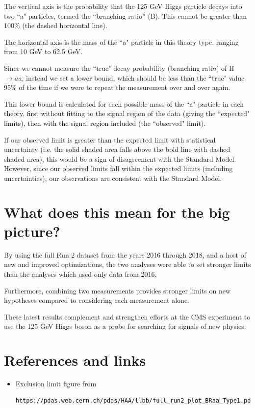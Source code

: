 \documentclass{article}
\begin{document}
The vertical axis is the probability that the 125 GeV Higgs particle decays into two ``a" particles, termed the ``branching ratio'' (B). This cannot be greater than 100\% (the dashed horizontal line). 

The horizontal axis is the mass of the ``a" particle in this theory type, ranging from 10 GeV to 62.5 GeV. 

Since we cannot measure the ``true" decay probability (branching ratio) of H $\rightarrow aa$, instead we set a lower bound, which should be less than the ``true" value 95\% of the time if we were to repeat the measurement over and over again.

This lower bound is calculated for each possible mass of the ``a" particle in each theory, first without fitting to the signal region of the data (giving the ``expected" limits), then with the signal region included (the ``observed" limit). 

If our observed limit is greater than the expected limit with statistical uncertainty (i.e. the solid shaded area falls above the bold line with dashed shaded area), this would be a sign of
disagreement with the Standard Model. However, since our observed limits fall within the expected limits (including uncertainties), our observations are consistent with the Standard Model. 


\section{What does this mean for the big picture?}

By using the full Run 2 dataset from the years 2016 through 2018, and a host of new and improved optimizations, the two analyses were able to set stronger limits than the analyses which used only data from 2016.

Furthermore, combining two measurements provides stronger limits on new hypotheses compared to considering each measurement alone.

These latest results complement and strengthen efforts at the CMS experiment to use the 125 GeV Higgs boson as a probe for searching for signals of new physics. 



\section{References and links}

\begin{itemize}
    \item Exclusion limit figure from \begin{verbatim}https://pdas.web.cern.ch/pdas/HAA/llbb/full_run2_plot_BRaa_Type1.pdf\end{verbatim}
\end{itemize}
\end{document}
